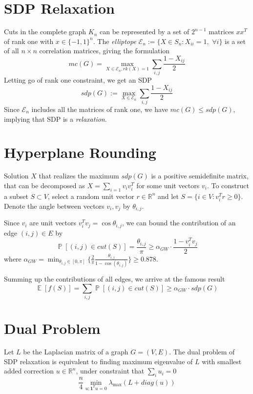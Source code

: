 \documentclass[twoside,leqno,twocolumn]{article}
\newcommand{\vect}[1]{\boldsymbol{#1}}
\DeclareMathOperator{\Ex}{\mathbb{E}}
\DeclareMathOperator{\Prob}{\mathbb{P}}
\begin{document}
\section{SDP Relaxation}
Cuts in the complete graph $K_n$ can be represented by a set of $2^{n - 1}$ matrices $x x^{T}$ of rank one with $x \in \lbrace -1, 1 \rbrace^{n}$. The {\it elliptope} $\mathcal{E}_{n} := \lbrace X \in S_{n} : X_{ii} = 1, \, \, \forall i \rbrace$ is a set of all $n \times n$ correlation matrices, giving the formulation
\begin{equation*}
mc(G) =
\max_{X \in \mathcal{E}_{n}, rk(X) = 1 } \sum_{i, j} \frac{1 - X_{ij}}{2} 
\end{equation*}
Letting go of rank one constraint, we get an SDP
\begin{equation*}
sdp(G) :=
\max_{X \in \mathcal{E}_{n}} \sum_{i, j} \frac{1 - X_{ij}}{2}
\end{equation*}
Since $\mathcal{E}_{n}$ includes all the matrices of rank one, we have $mc(G) \leq sdp(G)$, implying that SDP is a {\it relaxation}.

\section{Hyperplane Rounding} Solution $X$ that realizes the maximum $sdp(G)$ is a positive semidefinite matrix, that can be decomposed as $X=\sum_{i=1} v_{i}v_{i}^T$ for some unit vectors $v_{i}$. To construct a subset $S \subset V$, select a random unit vector $r \in \mathbb{R}^{n}$ and let $S = \lbrace i \in V : v_{i}^{T}r \geq 0 \rbrace$. Denote the angle between vectors $v_i, v_j$ by $\theta_{i, j}$. 

Since $v_{i}$ are unit vectors $v_{i}^{T} v_{j} = \cos{\theta_{i, j}}$, we can bound the contribution of an edge $(i, j) \in E$ by
$$
\Prob[(i, j) \in cut(S)] = 
\frac{\theta_{i, j}}{\pi}  \geq \alpha_{GW} \cdot
\frac{1 - v_{i}^{T} v_{j} }{2} 
$$
where $\alpha_{GW} = \min_{\theta_{i, j} \in [0, \pi]} \lbrace 
\frac{2}{\pi}\frac{\theta_{i, j}}{ { 1 - \cos(\theta_{i, j}) }} \rbrace \geq 0.878$. 

Summing up the contributions of all edges, we arrive at the famous result
\begin{equation*}
\Ex[f(S)] = \sum_{i, j} \Prob[(i, j) \in cut(S)] \geq \alpha_{GW} \cdot sdp(G)
\end{equation*}

\section{Dual Problem} 
Let $L$ be the Laplacian matrix of a graph $G = (V, E)$. The dual problem of SDP relaxation is equivalent to finding maximum eigenvalue of $L$ with smallest added correction $u \in \mathbb{R}^{n}$, under constraint that $\sum_{i} u_{i} = 0$
\begin{equation*}
\frac{n}{4} \min_{u: \vect{1}^{T} u = 0} \lambda_{\max}(L + diag(u))
\end{equation*}
\end{document}
